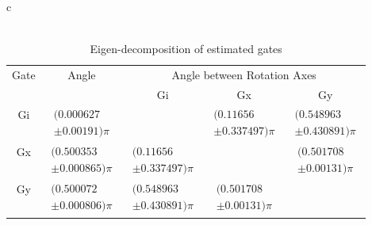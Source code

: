 \documentclass{beamer}
\begin{document}
\begin{frame}
\begin{table}[h]
\begin{center}
{\begin{tabular}{c}
\\
\vspace{2em}
\\
\begin{tabular}[l]{|c|c|c|c|c|}
\hline
\multirow{2}{*}{Gate} & \multirow{2}{*}{Angle} & \multicolumn{3}{c|}{Angle between Rotation Axes} \\ \cline{3-5}
 & & Gi & Gx & Gy \\ \hline
Gi & $ \begin{array}{c}(0.000627 \\ \pm 0.00191)\pi \end{array} $ &  & $ \begin{array}{c}(0.11656 \\ \pm 0.337497)\pi \end{array} $ & $ \begin{array}{c}(0.548963 \\ \pm 0.430891)\pi \end{array} $ \\ \hline
Gx & $ \begin{array}{c}(0.500353 \\ \pm 0.000865)\pi \end{array} $ & $ \begin{array}{c}(0.11656 \\ \pm 0.337497)\pi \end{array} $ &  & $ \begin{array}{c}(0.501708 \\ \pm 0.00131)\pi \end{array} $ \\ \hline
Gy & $ \begin{array}{c}(0.500072 \\ \pm 0.000806)\pi \end{array} $ & $ \begin{array}{c}(0.548963 \\ \pm 0.430891)\pi \end{array} $ & $ \begin{array}{c}(0.501708 \\ \pm 0.00131)\pi \end{array} $ &  \\ \hline
\end{tabular}

\end{tabular}
}
\caption{Eigen-decomposition of estimated gates}
\end{center}
\end{table}

\end{frame}
\end{document}
